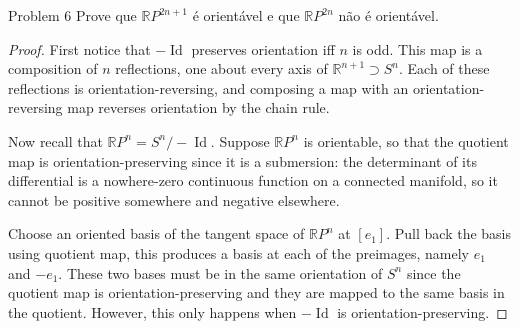 \begin{thing1}{Problem 6}\label{prob:6}\leavevmode
Prove que \(\mathbb{R}P^{2n+1}\) é orientável e que \(\mathbb{R}P^{2n}\) não é orientável.
\end{thing1}

\begin{proof}\leavevmode
	First notice that \(-\operatorname{Id}\) preserves orientation iff \(n\) is odd. This map is a composition of \(n\) reflections, one about every axis of \(\mathbb{R}^{n+1}\supset S^n\). Each of these reflections is orientation-reversing, and composing a map with an orientation-reversing map reverses orientation by the chain rule.

	Now recall that \(\mathbb{R}P^{n}=S^{n}/-\operatorname{Id}\). Suppose \(\mathbb{R}P^{n}\) is orientable, so that the quotient map is orientation-preserving since it is a submersion: the determinant of its differential is a nowhere-zero continuous function on a connected manifold, so it cannot be positive somewhere and negative elsewhere.

	Choose an oriented basis of the tangent space of \(\mathbb{R}P^{n}\) at \([e_1]\). Pull back the basis using quotient map, this produces a basis at each of the preimages, namely \(e_1\) and \(-e_1\). These two bases must be in the same orientation of \(S^{n}\) since the quotient map is orientation-preserving and they are mapped to the same basis in the quotient. However, this only happens when \(-\operatorname{Id}\) is orientation-preserving.
\end{proof}




